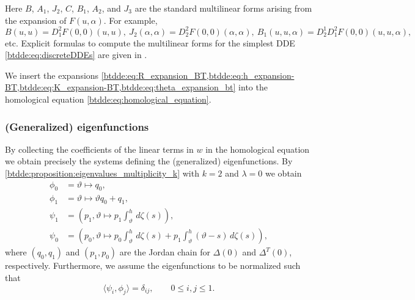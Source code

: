 %
Here $B$, $A_1$, $J_2$, $C$, $B_1$, $A_2$, and $J_3$ are the standard
multilinear forms arising from the expansion of $F(u,\alpha)$. For example,
\[
B(u,u) = D^2_1F(0,0)(u,u),~J_2(\alpha,\alpha) = D_2^2F(0,0)(\alpha,\alpha),~B_1(u,u,\alpha) = D^1_2D^2_1F(0,0)(u,u,\alpha),
\]
etc. Explicit formulas to compute the multilinear forms for the simplest DDE
\cref{btdde:eq:discreteDDEs} are given in \cite[Section 6]{Switching2019}.

We insert the expansions
\cref{btdde:eq:R_expansion_BT,btdde:eq:h_expansion-BT,btdde:eq:K_expansion-BT,btdde:eq:theta_expansion_bt}
into the homological equation \cref{btdde:eq:homological_equation}. 

\subsubsection{(Generalized) eigenfunctions}
By collecting the coefficients of the linear terms in $w$ in the
homological equation we obtain precisely the systems
defining the (generalized) eigenfunctions. By
\cref{btdde:proposition:eigenvalues_multiplicity_k} with $k=2$ and $\lambda=0$ we
obtain
\begin{align*}
    \phi_0  & =  \vartheta \mapsto q_0, \\
    \phi_1  & =  \vartheta \mapsto \vartheta q_0 + q_1, \\
    \psi_1 & = \left( p_1, \vartheta \mapsto p_1 \int_\vartheta^h \, d\zeta(s) \right), \nonumber \\
    \psi_0 & = \left( p_0, \vartheta \mapsto p_0 \int_\vartheta^h \, d\zeta(s)
                            + p_1 \int_{\vartheta}^h (\vartheta-s)\,d\zeta(s) \right),\nonumber 
\end{align*}
where $(q_0,q_1)$ and $(p_1,p_0)$ are the Jordan chain for $\Delta(0)$ and $\Delta^T(0)$, respectively.
Furthermore, we assume the eigenfunctions to be normalized such that
\begin{equation}
    \label{btdde:eq:bt_normalization_condition_eigenfunctions}
    \langle\psi_i,\phi_j\rangle = \delta_{ij}, \qquad 0\leq i,j \leq 1.
\end{equation}

